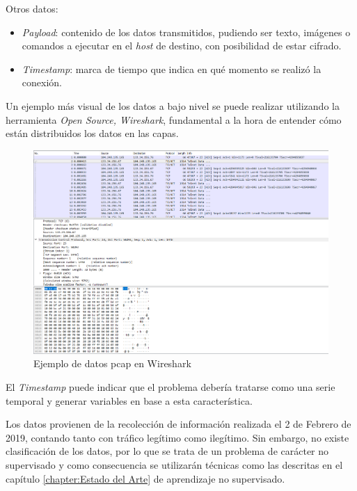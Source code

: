 Otros datos:

\begin{itemize}
    \item \textit{Payload}: contenido de los datos transmitidos, pudiendo ser texto, imágenes o comandos a ejecutar en el \textit{host} de destino, con posibilidad de estar cifrado.
    \item \textit{Timestamp}: marca de tiempo que indica en qué momento se realizó la conexión.
\end{itemize}

Un ejemplo más visual de los datos a bajo nivel se puede realizar utilizando la herramienta \textit{Open Source, Wireshark}, fundamental a la hora de entender cómo están distribuidos los datos en las capas.

\begin{figure}[H]
    \centering
    \includegraphics[width=15cm]{figs/wireshark.PNG}
    \caption{Ejemplo de datos pcap en Wireshark}
    \label{fig:wireshark}
\end{figure}

El \textit{Timestamp} puede indicar que el problema debería tratarse como una serie temporal y generar variables en base a esta característica.

Los datos provienen de la recolección de información realizada el 2 de Febrero de 2019, contando tanto con tráfico legítimo como ilegítimo. Sin embargo, no existe clasificación de los datos, por lo que se trata de un problema de carácter no supervisado y como consecuencia se utilizarán técnicas como las descritas en el capítulo \ref{chapter:Estado del Arte} de aprendizaje no supervisado.

\newpage